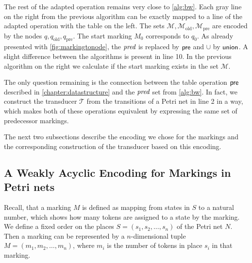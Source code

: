 The rest of the adapted operation remains very close to \autoref{alg:bw}. Each gray line on the right from the previous algorithm can be exactly mapped to a line of the adapted operation with the table on the left. The sets $\mathcal{M}, \mathcal{M}_{\text{old}}, \mathcal{M}_{\text{pre}}$ are encoded by the nodes $q,q_{\text{old}},q_{\text{pre}}$. The start marking $M_{0}$ corresponds to $q_{0}$. 
As already presented with \autoref{fig:markingtonode}, the $\operatorname{\textit{pred}}$ is replaced by $\operatorname{\textsf{pre}}$ and $\cup$ by $\operatorname{\textsf{union}}$. A slight difference between the algorithms is present in line 10. In the previous algorithm on the right we calculate if the start marking exists in the set $\mathcal{M}$. 

\par 

The only question remaining is the connection between the table operation $\operatorname{\textsf{pre}}$ described in \autoref{chapter:datastructure} and the $\operatorname{\textit{pred}}$ set from \autoref{alg:bw}. In fact, we construct the transducer $\mathcal{T}$ from the transitions of a Petri net in line 2 in a way, which makes both of these operations equivalent by expressing the same set of predecessor markings.

\par 

The next two subsections describe the encoding we chose for the markings and the corresponding construction of the transducer based on this encoding. 

\subsection{A Weakly Acyclic Encoding for Markings in Petri nets}
Recall, that a marking $M$ is defined as mapping from states in $S$ to a natural number, which shows how many tokens are assigned to a state by the marking. 
We define a fixed order on the places $S = (s_{1},s_{2},\dots,s_{n})$ of the Petri net $N$. Then a marking can be represented by a $n$-dimensional tuple $M = (m_{1},m_{2},\dots,m_{n})$, where $m_{i}$ is the number of tokens in place $s_{i}$ in that marking.

